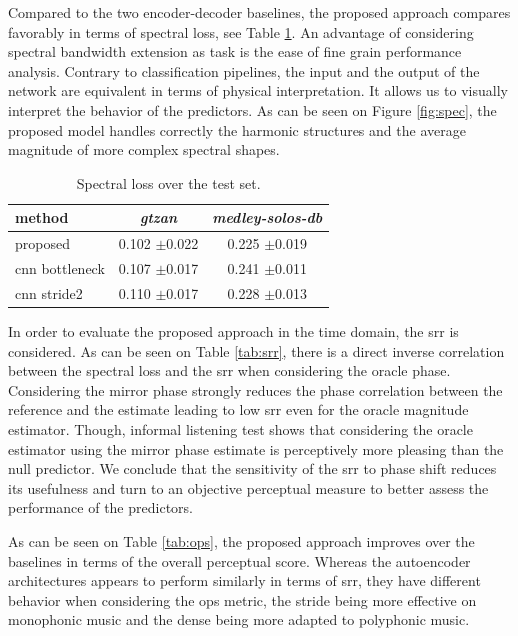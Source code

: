 \documentclass{article}
\begin{document}
Compared to the two encoder-decoder baselines, the proposed approach compares favorably in terms of spectral loss, see Table \ref{tab:loss}. An advantage of considering spectral bandwidth extension as task is the ease of fine grain performance analysis. Contrary to classification pipelines, the input and the output of the network are equivalent in terms of physical interpretation. It allows us to visually interpret the behavior of the predictors. As can be seen on Figure \ref{fig:spec}, the proposed model handles correctly the harmonic structures and the average magnitude of more complex spectral shapes.

\begin{table}[t]
  \caption{Spectral loss over the test set.}
  \label{tab:loss}
  \begin{center}
\begin{tabular}{lcc}
method & \textit{gtzan} & \textit{medley-solos-db} \\
\hline
proposed & 0.102 $\pm$0.022 & 0.225 $\pm$0.019 \\
cnn bottleneck & 0.107 $\pm$0.017 & 0.241 $\pm$0.011 \\
cnn stride2 & 0.110 $\pm$0.017 & 0.228 $\pm$0.013 \\
\end{tabular}
\end{center}
\vspace{-4mm}
\end{table}

In order to evaluate the proposed approach in the time domain, the srr is considered. As can be seen on Table \ref{tab:srr}, there is a direct inverse correlation between the spectral loss and the srr when considering the oracle phase. Considering the mirror phase strongly reduces the phase correlation between the reference and the estimate leading to low srr even for the oracle magnitude estimator. Though, informal listening test shows that considering the oracle estimator using the mirror phase estimate is perceptively more pleasing than the null predictor. We conclude that the sensitivity of the srr to phase shift reduces its usefulness and turn to an objective perceptual measure to better assess the performance of the predictors.

As can be seen on Table \ref{tab:ops}, the proposed approach improves over the baselines in terms of the overall perceptual score. Whereas the autoencoder architectures appears to perform similarly in terms of srr, they have different behavior when considering the ops metric, the stride being more effective on monophonic music and the dense being more adapted to polyphonic music.
\end{document}
